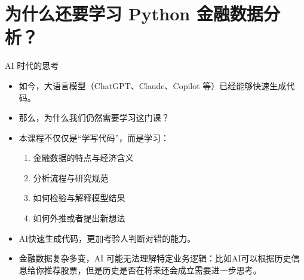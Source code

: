 \documentclass[9pt]{ctexbeamer}
\begin{document}
\section{为什么还要学习 Python 金融数据分析？}

\begin{frame}{AI 时代的思考}
  \begin{itemize}
    \item 如今，大语言模型（ChatGPT、Claude、Copilot 等）已经能够快速生成代码。
    \item 那么，为什么我们仍然需要学习这门课？
    \item 本课程不仅仅是“学写代码”，而是学习：
    \begin{enumerate}
      \item 金融数据的特点与经济含义
      \item 分析流程与研究规范
      \item 如何检验与解释模型结果
      \item 如何外推或者提出新想法
    \end{enumerate}
  \end{itemize}
 
  \begin{itemize}
    \item AI快速生成代码，更加考验人判断对错的能力。
    \item 金融数据复杂多变，AI 可能无法理解特定业务逻辑：比如AI可以根据历史信息给你推荐股票，但是历史是否在将来还会成立需要进一步思考。
  \end{itemize}
\end{frame}
\end{document}
